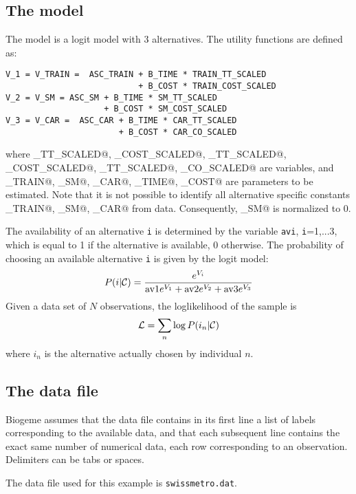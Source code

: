 \documentclass[12pt]{memoir}
\begin{document}
\subsection{The model}
The model is a logit model with 3 alternatives. The utility functions are defined as:
{\footnotesize
\begin{verbatim}
V_1 = V_TRAIN =  ASC_TRAIN + B_TIME * TRAIN_TT_SCALED 
                           + B_COST * TRAIN_COST_SCALED
V_2 = V_SM = ASC_SM + B_TIME * SM_TT_SCALED 
                    + B_COST * SM_COST_SCALED
V_3 = V_CAR =  ASC_CAR + B_TIME * CAR_TT_SCALED 
                       + B_COST * CAR_CO_SCALED
\end{verbatim}
}
where 
\verb@TRAIN_TT_SCALED@,
\verb@TRAIN_COST_SCALED@,
\verb@SM_TT_SCALED@,
\verb@SM_COST_SCALED@,
\verb@CAR_TT_SCALED@,
\verb@CAR_CO_SCALED@
are variables, and 
  \verb@ASC_TRAIN@,
  \verb@ASC_SM@,
  \verb@ASC_CAR@,
  \verb@B_TIME@,
  \verb@B_COST@ are parameters to be estimated. Note that it is not possible to identify all alternative specific constants  
  \verb@ASC_TRAIN@,
  \verb@ASC_SM@,
  \verb@ASC_CAR@ from data. Consequently,  \verb@ASC_SM@ is normalized to 0. 

The availability of an alternative \texttt{i} is determined by the
variable \texttt{avi}, \texttt{i}=1,...3, which is equal to 1 if the
alternative is available, 0 otherwise. The probability of choosing an
available alternative \texttt{i} is given by the logit model: 
\begin{equation}
P(i|\mathcal{C}) = \frac{e^{V_i}}{\text{av1} e^{V_1} + \text{av2} e^{V_2}+ \text{av3} e^{V_3}}
\end{equation}
Given a data set of $N$ observations, the loglikelihood of the
sample is 
\begin{equation}
\mathcal{L} = \sum_n \log P(i_n|\mathcal{C})
\end{equation}
where $i_n$ is the alternative actually chosen
by individual $n$.  

\subsection{The data file}

Biogeme assumes that the data file contains in its first line a list
of labels corresponding to the available data, and that each
subsequent line contains the exact same number of numerical data, each
row corresponding to an observation. Delimiters can be tabs or spaces.

The data file used for this example is \texttt{swissmetro.dat}.
\end{document}
